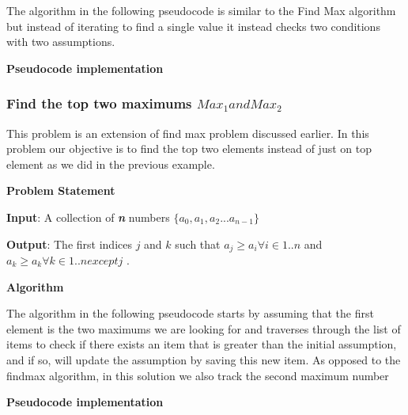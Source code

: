 \documentclass[12pt,a4paper]{book}
\begin{document}
\noindent The algorithm in the following pseudocode is similar to the Find Max algorithm but instead of iterating to find a single value it instead checks two conditions with two assumptions.
\par

\noindent \textbf {Pseudocode implementation}

\subsubsection{Find the top two maximums $Max_{1} and Max_{2} $}
This problem is an extension of find max problem discussed earlier. In this problem our objective is to find the top two elements instead of just on top element as we did in the previous example.\par
\noindent \textbf {Problem Statement} \par
\textbf{Input}: A collection of \textbf{\textit{n}} numbers $\{a_{0} , a_{1} , a_{2} ... a_{n-1} \}$\par
\textbf{Output}: The first indices $j$ and $k$ such that  $a_{j} \geq a_{i}  \forall i \in {1..n}$ and $a_{k} \geq a_{k}  \forall k \in {1..n} except j$  . \par
\noindent \textbf {Algorithm} \par
\noindent The algorithm in the following pseudocode starts by assuming that the first element is the two maximums we are looking for and traverses through the list of items to check if there exists an item that is greater than the initial assumption, and if so, will update the assumption by saving this new item. As opposed to the findmax algorithm, in this solution we also track the second maximum number \par
\noindent \textbf {Pseudocode implementation}

\end{document}
